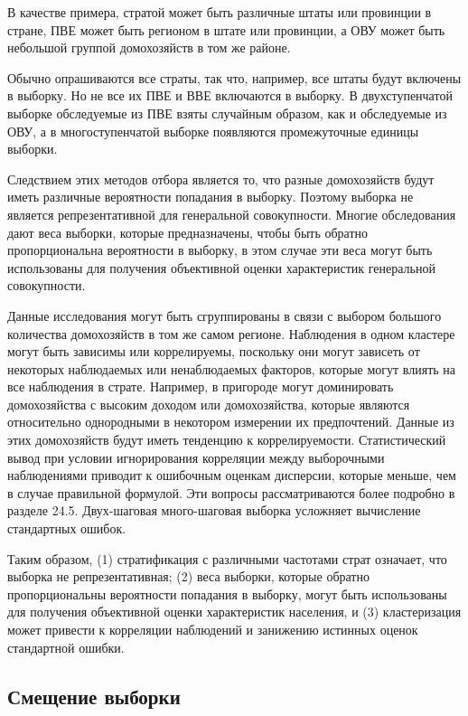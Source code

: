 В качестве примера, стратой может быть различные штаты или провинции в стране, ПВЕ может быть регионом в штате или провинции, а ОВУ может быть небольшой группой домохозяйств в том же районе.
	
	
Обычно опрашиваются все страты, так что, например, все штаты будут включены в выборку. Но не все их ПВЕ и ВВЕ включаются в выборку. В двухступенчатой выборке обследуемые из ПВЕ взяты случайным образом, как и обследуемые из ОВУ, а в многоступенчатой выборке появляются промежуточные единицы выборки.


Следствием этих методов отбора является то, что разные домохозяйств будут иметь различные вероятности попадания в выборку. Поэтому выборка не является репрезентативной для генеральной совокупности. Многие обследования дают веса выборки, которые предназначены, чтобы быть обратно пропорциональна вероятности в выборку, в этом случае эти веса могут быть использованы для получения объективной оценки характеристик генеральной совокупности.
	
	
Данные исследования могут быть сгруппированы в связи с выбором большого количества домохозяйств в том же самом регионе. Наблюдения в одном кластере могут быть зависимы или коррелируемы, поскольку они могут зависеть от некоторых наблюдаемых или ненаблюдаемых факторов, которые могут влиять на все наблюдения в страте. Например, в пригороде могут доминировать домохозяйства с высоким доходом или домохозяйства, которые являются относительно однородными в некотором измерении их предпочтений. Данные из этих домохозяйств будут иметь тенденцию к коррелируемости. Статистический вывод при условии игнорирования корреляции между выборочными наблюдениями приводит к ошибочным оценкам дисперсии, которые меньше, чем в случае правильной формулой. Эти вопросы рассматриваются более подробно в разделе 24.5. Двух-шаговая  много-шаговая выборка усложняет вычисление стандартных ошибок.
	
	
Таким образом, (1) стратификация с различными частотами страт означает, что выборка не репрезентативная; (2) веса выборки, которые обратно пропорциональны вероятности попадания в выборку, могут быть использованы для получения объективной оценки характеристик населения, и (3) кластеризация может привести к корреляции наблюдений и занижению истинных оценок стандартной ошибки.
	
	
\subsection{Смещение выборки}

